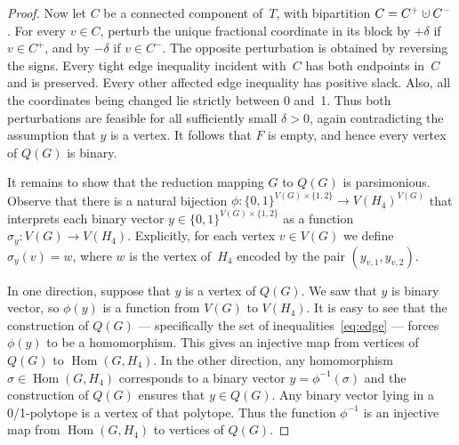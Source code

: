 \documentclass[10pt,a4paper]{amsart}
\def\Hfour{H_4}
\def\Hom{\mathop{\mathrm{Hom}}}
\newcommand{\cupdot}{\mathbin{\mathaccent\cdot\cup}}
\begin{document}
\begin{proof}
Now let $C$ be a connected component of~$T$, with bipartition $C=C^+\cupdot C^-$.  For every $v\in C$, perturb the unique fractional coordinate in its block by $+\delta$ if $v\in C^+$, and by $-\delta$ if $v\in C^-$.  The opposite perturbation is obtained by reversing the signs.  Every tight edge inequality incident with~$C$ has both endpoints in~$C$ and is preserved.  Every other affected edge inequality has positive slack.  Also, all the coordinates being changed lie strictly between 0 and~1.  Thus both perturbations are feasible for all sufficiently small $\delta>0$, again contradicting the assumption that $y$ is a vertex.  It follows that $F$ is empty, and hence every vertex of $Q(G)$ is binary.

It remains to show that the reduction mapping $G$ to $Q(G)$ is parsimonious.  Observe that there is a natural bijection $\phi:\{0,1\}^{V(G)\times\{1,2\}}\to V(\Hfour)^{V(G)}$ that interprets each binary vector $y\in\{0,1\}^{V(G)\times\{1,2\}}$ as a function $\sigma_y:V(G)\to V(\Hfour)$.  Explicitly, for each vertex $v\in V(G)$ we define $\sigma_y(v)=w$, where $w$ is the vertex of~$\Hfour$ encoded by the pair $(y_{v,1},y_{v,2})$.

In one direction, suppose that $y$ is a vertex of $Q(G)$.  We saw that $y$ is binary vector, so $\phi(y)$ is a function from $V(G)$ to $V(\Hfour)$.  It is easy to see that the construction of $Q(G)$ --- specifically the set of inequalities~\eqref{eq:edge} --- forces $\phi(y)$ to be a homomorphism.  This gives an injective map from vertices of $Q(G)$ to $\Hom(G,\Hfour)$.  In the other direction, any homomorphism  $\sigma\in\Hom(G,\Hfour)$ corresponds to a binary vector $y=\phi^{-1}(\sigma)$ and the construction of $Q(G)$ ensures that $y\in Q(G)$.  Any binary vector lying in a 0/1-polytope is a vertex of that polytope.  Thus the function $\phi^{-1}$ is an injective map from $\Hom(G,\Hfour)$ to vertices of $Q(G)$.
\end{proof}  
\end{document}
